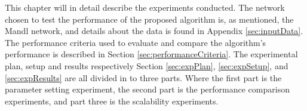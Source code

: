 

This chapter will in detail describe the experiments conducted. The network chosen to test the performance of the proposed algorithm is, as mentioned, the Mandl network\citep{mandl79}, and details about the data is found in Appendix \vref{sec:inputData}. The performance criteria used to evaluate and compare the algorithm's performance is described in Section \vref{sec:performanceCriteria}. 
The experimental plan, setup and results respectively Section \vref{sec:expPlan}, \vref{sec:expSetup}, and \vref{sec:expResults} are all divided in to three parts. Where the first part is the parameter setting experiment, the second part is the performance comparison experiments, and part three is the scalability experiments. 

